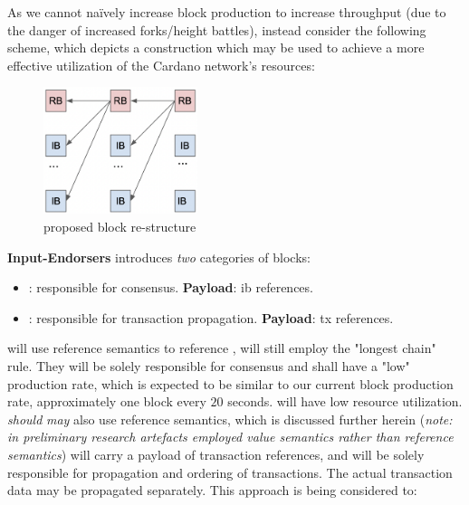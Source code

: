 \documentclass[11pt,a4paper]{article}
\begin{document}
As we cannot naïvely increase block production to increase throughput (due to the danger of increased 
forks/height battles), instead consider the following scheme, which depicts a construction which may 
be used to achieve a more effective utilization of the Cardano network's resources:

\begin{figure}[ht]
  \includegraphics[width=0.4\textwidth]{ie_structure.png}
  \centering
  \caption{proposed block re-structure}
  \label{fig:proposed re-structure}
\end{figure}

\pagebreak

\textbf{Input-Endorsers} introduces \emph{two} categories of blocks:
\begin{itemize}
  \item \emph{}: responsible for consensus. 
    \subitem \textbf{Payload}: \gls{ib} references.
  \item \emph{}: responsible for transaction propagation.
    \subitem \textbf{Payload}: \gls{tx} references.
\end{itemize}

\textbf{} will use reference semantics to reference ,  will still employ
the "longest chain" rule. They will be solely responsible for consensus and shall have a "low"
production rate, which is expected to be similar to our current block production rate, approximately 
one block every $20$ seconds.  will have low resource utilization. \\

\textbf{} \emph{should} \emph{may} also use reference semantics, which is discussed further herein 
(\emph{note: in preliminary research artefacts  employed value semantics rather than reference 
semantics})  will carry a payload of transaction references, and will be solely responsible for 
propagation and ordering of transactions. The actual transaction data may be propagated separately. 
This approach is being considered to:
\end{document}
